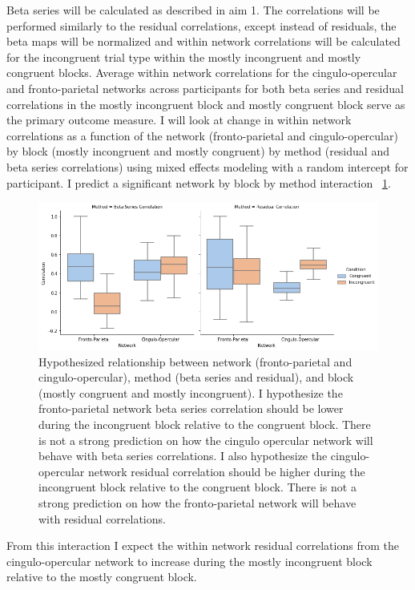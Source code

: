 \documentclass[phd,appendix,figures]{uithesis}
\begin{document}
Beta series will be calculated as described in aim 1.
The correlations will be performed similarly to the residual correlations, except instead of residuals, the beta maps will be normalized and within network correlations will be calculated for the incongruent trial type within the mostly incongruent and mostly congruent blocks.
Average within network correlations for the cingulo-opercular and fronto-parietal networks across participants for both beta series and residual correlations in the mostly incongruent block and mostly congruent block serve as the primary outcome measure.
I will look at change in within network correlations as a function of the network (fronto-parietal and cingulo-opercular) by block (mostly incongruent and mostly congruent) by method (residual and beta series correlations) using mixed effects modeling with a random intercept for participant.
I predict a significant network by block by method interaction ~\ref{fig:aim_2_validation}.
\begin{figure}[H]%
	\centering
	\includegraphics[width=1\linewidth]{aim_2_validation}
	\caption{Hypothesized relationship between network (fronto-parietal and cingulo-opercular), method (beta series and residual), and block (mostly congruent and mostly incongruent).
	I hypothesize the fronto-parietal network beta series correlation should be lower during the incongruent block relative to the congruent block.
	There is not a strong prediction on how the cingulo opercular network will behave with beta series correlations.
	I also hypothesize the cingulo-opercular network residual correlation should be higher during the incongruent block relative to the congruent block.
	There is not a strong prediction on how the fronto-parietal network will behave with residual correlations.}
	\label{fig:aim_2_validation}
\end{figure}
From this interaction I expect the within network residual correlations from the cingulo-opercular network to increase during the mostly incongruent block relative to the mostly congruent block.
\end{document}
